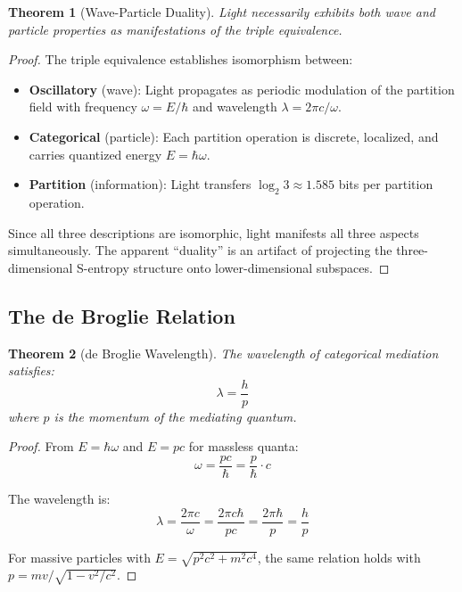 \documentclass[aps,prl,twocolumn,superscriptaddress,floatfix]{revtex4-2}
\newtheorem{theorem}{Theorem}
\begin{document}
\begin{theorem}[Wave-Particle Duality]
Light necessarily exhibits both wave and particle properties as manifestations of the triple equivalence.
\end{theorem}

\begin{proof}
The triple equivalence establishes isomorphism between:
\begin{itemize}
\item \textbf{Oscillatory} (wave): Light propagates as periodic modulation of the partition field with frequency $\omega = E/\hbar$ and wavelength $\lambda = 2\pi c/\omega$.
\item \textbf{Categorical} (particle): Each partition operation is discrete, localized, and carries quantized energy $E = \hbar\omega$.
\item \textbf{Partition} (information): Light transfers $\log_2 3 \approx 1.585$ bits per partition operation.
\end{itemize}

Since all three descriptions are isomorphic, light manifests all three aspects simultaneously. The apparent ``duality'' is an artifact of projecting the three-dimensional S-entropy structure onto lower-dimensional subspaces.
\end{proof}

\subsection{The de Broglie Relation}

\begin{theorem}[de Broglie Wavelength]
The wavelength of categorical mediation satisfies:
\begin{equation}
\lambda = \frac{h}{p}
\end{equation}
where $p$ is the momentum of the mediating quantum.
\end{theorem}

\begin{proof}
From $E = \hbar\omega$ and $E = pc$ for massless quanta:
\begin{equation}
\omega = \frac{pc}{\hbar} = \frac{p}{\hbar} \cdot c
\end{equation}

The wavelength is:
\begin{equation}
\lambda = \frac{2\pi c}{\omega} = \frac{2\pi c \hbar}{pc} = \frac{2\pi\hbar}{p} = \frac{h}{p}
\end{equation}

For massive particles with $E = \sqrt{p^2c^2 + m^2c^4}$, the same relation holds with $p = mv/\sqrt{1-v^2/c^2}$.
\end{proof}
\end{document}
